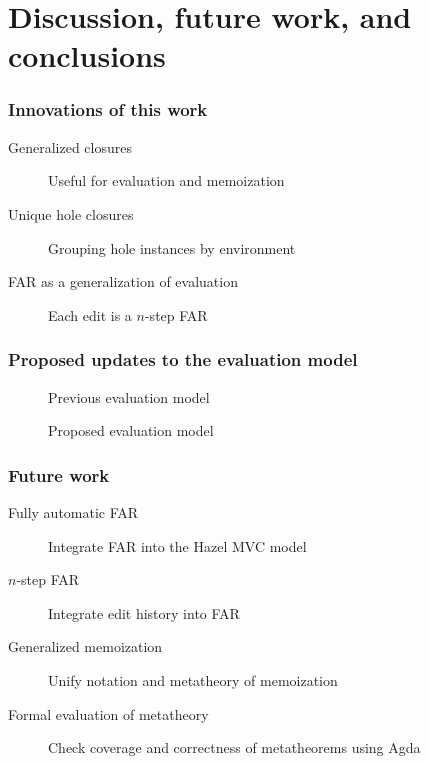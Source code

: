 \documentclass{beamer}
\begin{document}
\section{Discussion, future work, and conclusions}

\begin{frame}
  \frametitle{Innovations of this work}

  \begin{description}
  \item[Generalized closures] Useful for evaluation and memoization
  \item[Unique hole closures] Grouping hole instances by environment
  \item[FAR as a generalization of evaluation] Each edit is a $n$-step FAR
  \end{description}
\end{frame}

\begin{frame}[allowframebreaks]
  \frametitle{Proposed updates to the evaluation model}

  \begin{figure}
    \centering
    \maxsizebox{\textwidth}{15em}{
      
    }
    \caption{Previous evaluation model}
    \label{fig:prev-evaluation-call-graph}
  \end{figure}

  \begin{figure}
    \centering
    \maxsizebox{\textwidth}{15em}{
      
    }
    \caption{Proposed evaluation model}
    \label{fig:current-evaluation-call-graph}
  \end{figure}
\end{frame}

\begin{frame}
  \frametitle{Future work}

  \begin{description}
  \item[Fully automatic FAR] Integrate FAR into the Hazel MVC model
  \item[$n$-step FAR] Integrate edit history into FAR
  \item[Generalized memoization] Unify notation and metatheory of memoization
  \item[Formal evaluation of metatheory] Check coverage and correctness of metatheorems using Agda
  \end{description}
\end{frame}
\end{document}
